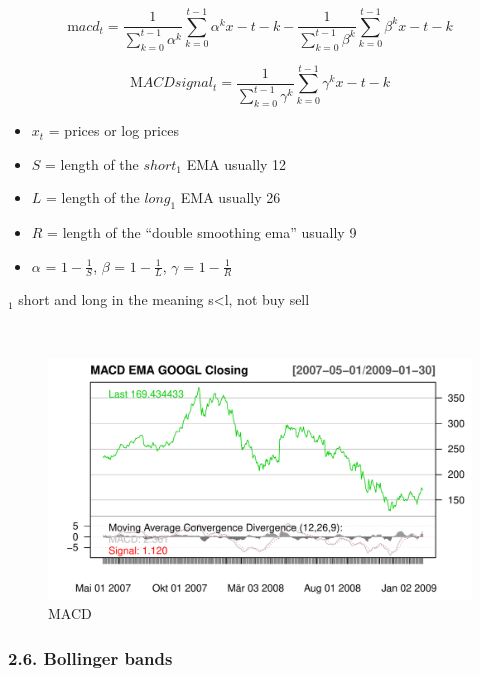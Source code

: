 \documentclass[
]{article}
\providecommand{\tightlist}{%
  \setlength{\itemsep}{0pt}\setlength{\parskip}{0pt}}
\begin{document}
\begin{equation}
  \label{eq:MACD}
  \mathrm macd_t =\frac{1}{\sum_{k=0}^{t-1}\alpha^{k}} \sum_{k=0}^{t-1}\alpha^{k}x-{t-k}-\frac{1}{\sum_{k=0}^{t-1}\beta^{k}}\sum_{k=0}^{t-1}\beta^{k}x-{t-k}
\end{equation}

\begin{equation}
  \label{eq:signal MACD}
\mathrm  MACD signal_t=   \frac{1}{\sum_{k=0}^{t-1}\gamma^{k}}\sum_{k=0}^{t-1}\gamma^{k}x-{t-k}
\end{equation}

\begin{itemize}
\tightlist
\item
  \(x_t\) = prices or log prices
\item
  \(S\) = length of the \(short_1\) EMA usually 12
\item
  \(L\) = length of the \(long_1\) EMA usually 26
\item
  \(R\) = length of the ``double smoothing ema'' usually 9
\item
  \(\alpha\) = \(1-\frac{1}{S}\), \(\beta\) = \(1-\frac{1}{L}\),
  \(\gamma\) = \(1-\frac{1}{R}\)
\end{itemize}

\(_1\) short and long in the meaning s\textless l, not buy sell

~

\begin{figure}

{\centering \includegraphics[width=0.7\linewidth]{00_main_files/figure-latex/chap2.5-1} 

}

\caption{MACD}\label{fig:chap2.5}
\end{figure}
\newpage

\hypertarget{bollinger-bands}{%
\subsubsection{2.6. Bollinger bands}\label{bollinger-bands}}
\end{document}
